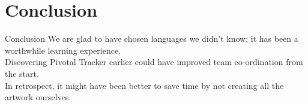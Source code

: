 \documentclass{beamer}
\begin{document}
\section{Conclusion}

\begin{frame}{Conclusion}
  We are glad to have chosen languages we didn't know; it has been a worthwhile learning experience.\\
  \vspace{\baselineskip}
  Discovering Pivotal Tracker earlier could have improved team co-ordination from the start.\\
  \vspace{\baselineskip}
  In retrospect, it might have been better to save time by not creating all the artwork ourselves.
\end{frame}
\end{document}
